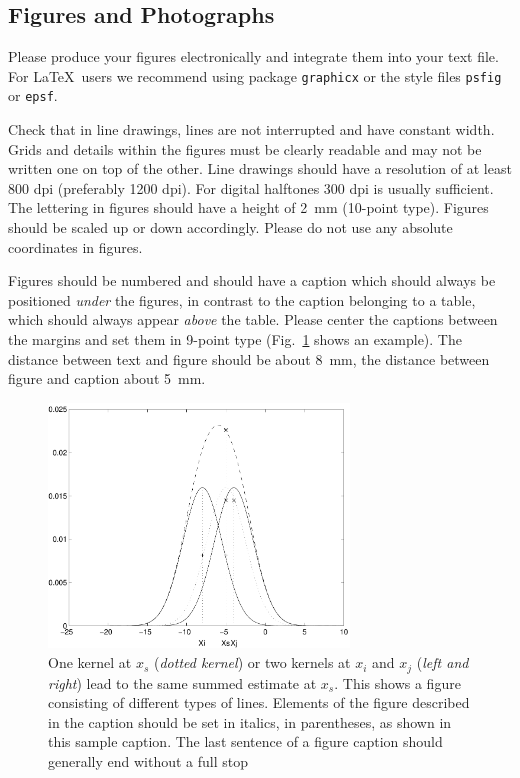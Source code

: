\documentclass[runningheads]{llncs}
\begin{document}
\subsection{Figures and Photographs}
\label{sect:figures}

Please produce your figures electronically and integrate
them into your text file. For \LaTeX\ users we recommend using package
\verb+graphicx+ or the style files \verb+psfig+ or \verb+epsf+.

Check that in line drawings, lines are not
interrupted and have constant width. Grids and details within the
figures must be clearly readable and may not be written one on top of
the other. Line drawings should have a resolution of at least 800 dpi
(preferably 1200 dpi).
For digital halftones 300 dpi is usually sufficient.
The lettering in figures should have a height of 2~mm (10-point type).
Figures should be scaled up or down accordingly.
Please do not use any absolute coordinates in figures.

Figures should be numbered and should have a caption which should
always be positioned {\it under} the figures, in contrast to the caption
belonging to a table, which should always appear {\it above} the table.
Please center the captions between the margins and set them in
9-point type
(Fig.~\ref{fig:example} shows an example).
The distance between text and figure should be about 8~mm, the
distance between figure and caption about 5~mm.
\begin{figure}
	\centering
	\includegraphics[height=6.5cm]{eijkel2}
	\caption{One kernel at $x_s$ ({\it dotted kernel}) or two kernels at
		$x_i$ and $x_j$ ({\it left and right}) lead to the same summed estimate
		at $x_s$. This shows a figure consisting of different types of
		lines. Elements of the figure described in the caption should be set in
		italics,
		in parentheses, as shown in this sample caption. The last
		sentence of a figure caption should generally end without a full stop}
	\label{fig:example}
\end{figure}
\end{document}

